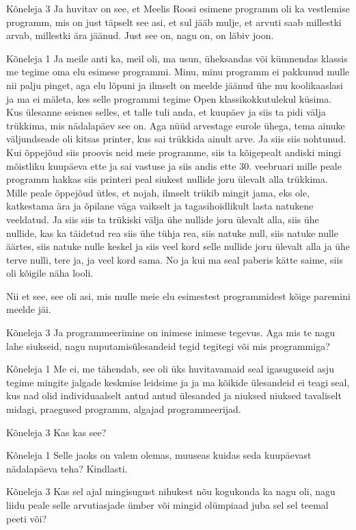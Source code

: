 Kõneleja 3
Ja huvitav on see, et Meelis Roosi esimene programm oli ka vestlemise programm, mis on just täpselt see asi, et sul jääb mulje, et arvuti saab millestki arvab, millestki ära jäänud. Just see on, nagu on, on läbiv joon. 

Kõneleja 1
Ja meile anti ka, meil oli, ma usun, üheksandas või kümnendas klassis me tegime oma elu esimese programmi. Minu, minu programm ei pakkunud mulle nii palju pinget, aga elu lõpuni ja ilmselt on meelde jäänud ühe mu koolikaaslasi ja ma ei mäleta, kes selle programmi tegime Open klassikokkutulekul küsima. Kus ülesanne seisnes selles, et talle tuli anda, et kuupäev ja siis ta pidi välja trükkima, mis nädalapäev see on. Aga nüüd arvestage eurole ühega, tema ainuke väljundseade oli kitsas printer, kus sai trükkida ainult arve. Ja siis siis nohtunud. Kui õppejõud siis proovis neid meie programme, siis ta kõigepealt andiski mingi mõistliku kuupäeva ette ja sai vastuse ja siis andis ette 30. veebruari mille peale programm hakkas siis printeri peal siukest nullide joru ülevalt alla trükkima. Mille peale õppejõud ütles, et nojah, ilmselt trükib mingit jama, eks ole, katkestama ära ja õpilane väga vaikselt ja tagasihoidlikult lasta natukene veeldatud. Ja siis siis ta trükiski välja ühe nullide joru ülevalt alla, siis ühe nullide, kas ka täidetud rea siis ühe tühja rea, siis natuke null, siis natuke nulle äärtes, siis natuke nulle keskel ja siis veel kord selle nullide joru ülevalt alla ja ühe terve nulli, tere ja, ja veel kord sama. No ja kui ma seal paberis kätte saime, siis oli kõigile näha looli. 

Nii et see, see oli asi, mis mulle meie elu esimestest programmidest kõige paremini meelde jäi. 

Kõneleja 3
Ja programmeerimine on inimese inimese tegevus. Aga mis te nagu lahe siukseid, nagu nuputamisülesandeid tegid tegitegi või mis programmiga? 

Kõneleja 1
Me ei, me tähendab, see oli üks huvitavamaid seal igasuguseid asju tegime mingite jalgade keskmise leidsime ja ja ma kõikide ülesandeid ei teagi seal, kus nad olid individuaalselt antud antud ülesanded ja niuksed niuksed tavaliselt midagi, praegused programm, algajad programmeerijad. 

Kõneleja 3
Kas kas see? 

Kõneleja 1
Selle jaoks on valem olemas, muuseas kuidas seda kuupäevast nädalapäeva teha? Kindlasti. 

Kõneleja 3
Kas sel ajal mingisugust nihukest nõu kogukonda ka nagu oli, nagu liidu peale selle arvutiasjade ümber või mingid olümpiaad juba sel sel teemal peeti või? 

